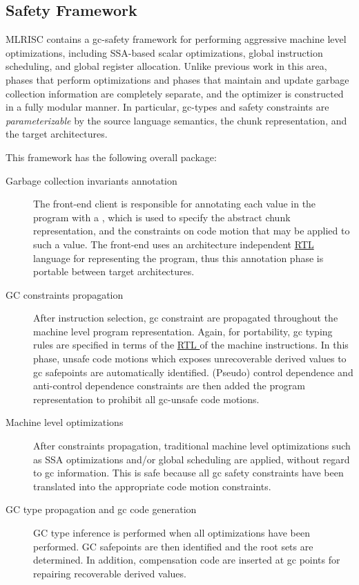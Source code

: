 \subsection{Safety Framework}
  MLRISC contains a gc-safety framework 
for performing aggressive machine level optimizations, including SSA-based
scalar optimizations, global instruction scheduling, and global
register allocation.  Unlike previous work in this area, phases that
perform optimizations and phases that maintain and update 
garbage collection information are completely separate, and the optimizer
is constructed in a fully modular manner.  In particular,
gc-types and safety constraints 
are \emph{parameterizable} 
by the source language semantics, the chunk representation, 
and the target architectures.  

This framework has the following overall package:
\begin{description}
\item[Garbage collection invariants annotation]
The front-end client is responsible for annotating each 
value in the program with a , which is 
used to specify the abstract chunk representation, 
and the constraints on code motion that may be applied to such a value.
The front-end uses an architecture independent \href{codetree.html}{RTL} 
language for representing the program, thus this annotation 
phase is portable between target architectures. 
\item[GC constraints propagation]
    After instruction selection, gc constraint are propagated throughout
the machine level program representation.  Again, for portability, gc typing
rules are specified in terms of the \href{codetree.html}{ RTL } of
the machine instructions.  In this phase, unsafe code motions which
exposes unrecoverable derived values to gc safepoints are automatically 
identified.   (Pseudo) control dependence and anti-control dependence 
constraints are then added the  program representation to prohibit all
gc-unsafe code motions.
\item[Machine level optimizations]
    After constraints propagation, traditional 
machine level optimizations such as
SSA optimizations and/or global scheduling are applied, without regard
to gc information.  This is safe because 
all gc safety constraints have been translated into the appropriate 
code motion constraints. 
\item[GC type propagation and gc code generation]
    GC type inference is performed when all optimizations
have been performed.  GC safepoints are then
identified and the root sets are determined.  In addition, compensation
code are inserted at gc points for repairing recoverable derived values.
\end{description}
